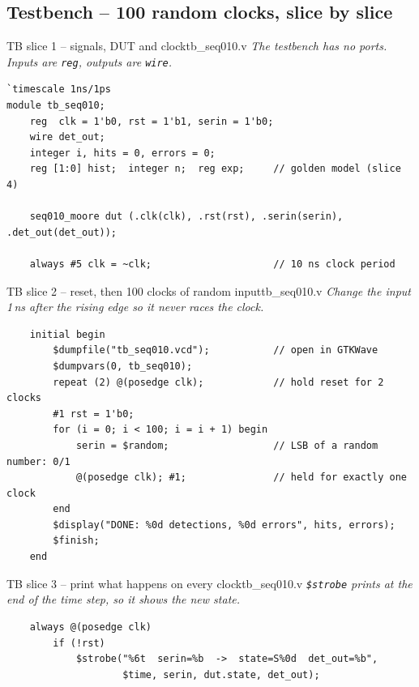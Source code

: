 \documentclass[10pt,a4paper]{article}
\newcommand{\slicenote}[1]{{\small\color{black!70}\itshape #1}\par\smallskip}
\begin{document}
\subsection{Testbench -- 100 random clocks, slice by slice}
\begin{codeslice}{TB slice 1 -- signals, DUT and clock}{tb\_seq010.v}
\slicenote{The testbench has no ports. Inputs are \texttt{reg}, outputs are \texttt{wire}.}
\begin{lstlisting}
`timescale 1ns/1ps
module tb_seq010;
    reg  clk = 1'b0, rst = 1'b1, serin = 1'b0;
    wire det_out;
    integer i, hits = 0, errors = 0;
    reg [1:0] hist;  integer n;  reg exp;     // golden model (slice 4)

    seq010_moore dut (.clk(clk), .rst(rst), .serin(serin), .det_out(det_out));

    always #5 clk = ~clk;                     // 10 ns clock period
\end{lstlisting}
\end{codeslice}
\begin{codeslice}{TB slice 2 -- reset, then 100 clocks of random input}{tb\_seq010.v}
\slicenote{Change the input 1\,ns after the rising edge so it never races the clock.}
\begin{lstlisting}
    initial begin
        $dumpfile("tb_seq010.vcd");           // open in GTKWave
        $dumpvars(0, tb_seq010);
        repeat (2) @(posedge clk);            // hold reset for 2 clocks
        #1 rst = 1'b0;
        for (i = 0; i < 100; i = i + 1) begin
            serin = $random;                  // LSB of a random number: 0/1
            @(posedge clk); #1;               // held for exactly one clock
        end
        $display("DONE: %0d detections, %0d errors", hits, errors);
        $finish;
    end
\end{lstlisting}
\end{codeslice}
\begin{codeslice}{TB slice 3 -- print what happens on every clock}{tb\_seq010.v}
\slicenote{\texttt{\$strobe} prints at the end of the time step, so it shows the new state.}
\begin{lstlisting}
    always @(posedge clk)
        if (!rst)
            $strobe("%6t  serin=%b  ->  state=S%0d  det_out=%b",
                    $time, serin, dut.state, det_out);
\end{lstlisting}
\end{codeslice}
\end{document}
